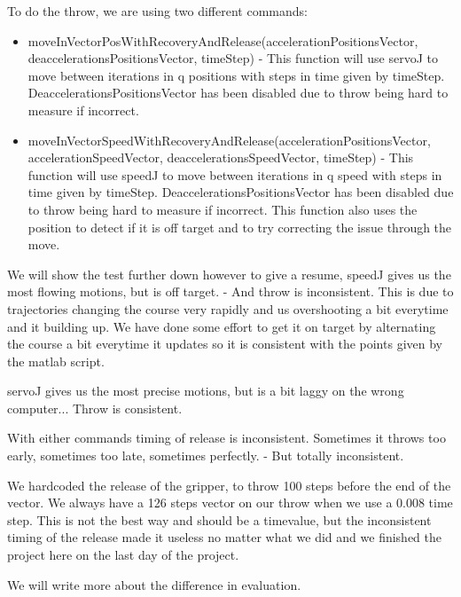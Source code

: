 To do the throw, we are using two different commands:
\begin{itemize}
    \item moveInVectorPosWithRecoveryAndRelease(accelerationPositionsVector, deaccelerationsPositionsVector, timeStep)
    \linebreak- This function will use servoJ to move between iterations in q positions with steps in time given by timeStep. DeaccelerationsPositionsVector has been disabled due to throw being hard to measure if incorrect.
    \item moveInVectorSpeedWithRecoveryAndRelease(accelerationPositionsVector, accelerationSpeedVector, deaccelerationsSpeedVector, timeStep)
    \linebreak- This function will use speedJ to move between iterations in q speed with steps in time given by timeStep. DeaccelerationsPositionsVector has been disabled due to throw being hard to measure if incorrect.
    This function also uses the position to detect if it is off target and to try correcting the issue through the move.
\end{itemize}

We will show the test further down however to give a resume, speedJ gives us the most flowing motions, but is off target. - And throw is inconsistent. 
This is due to trajectories changing the course very rapidly and us overshooting a bit everytime and it building up. 
We have done some effort to get it on target by alternating the course a bit everytime it updates so it is consistent with the points given by the matlab script.

servoJ gives us the most precise motions, but is a bit laggy on the wrong computer... Throw is consistent.

With either commands timing of release is inconsistent. Sometimes it throws too early, sometimes too late, sometimes perfectly. - But totally inconsistent.

We hardcoded the release of the gripper, to throw 100 steps before the end of the vector. We always have a 126 steps vector on our throw when we use a 0.008 time step.
This is not the best way and should be a timevalue, but the inconsistent timing of the release made it useless no matter what we did and we finished the project here on the last day of the project.

We will write more about the difference in evaluation.



